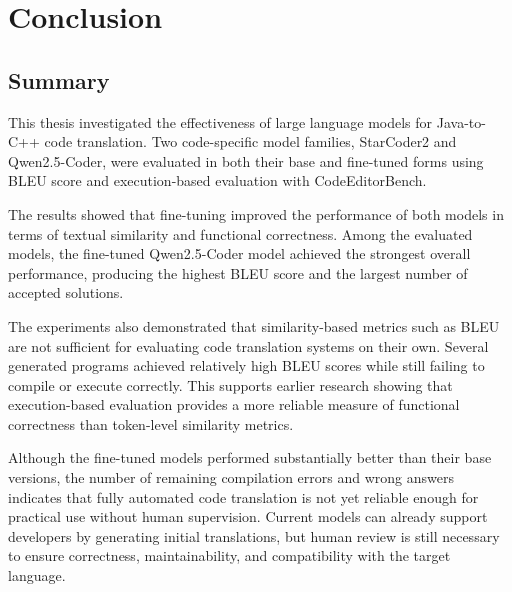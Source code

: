 \chapter{Conclusion}

\section{Summary}

This thesis investigated the effectiveness of large language models for
Java-to-C++ code translation. Two code-specific model families, StarCoder2 and
Qwen2.5-Coder, were evaluated in both their base and fine-tuned forms using
BLEU score and execution-based evaluation with CodeEditorBench.

The results showed that fine-tuning improved the performance of both models in
terms of textual similarity and functional correctness. Among the evaluated %
models, the fine-tuned Qwen2.5-Coder model achieved the strongest overall
performance, producing the highest BLEU score and the largest number of accepted
solutions.

The experiments also demonstrated that similarity-based metrics such as BLEU are
not sufficient for evaluating code translation systems on their own. Several
generated programs achieved relatively high BLEU scores while still failing to
compile or execute correctly. This supports earlier research showing that
execution-based evaluation provides a more reliable measure of functional
correctness than token-level similarity metrics.

Although the fine-tuned models performed substantially better than their base
versions, the number of remaining compilation errors and wrong answers indicates
that fully automated code translation is not yet reliable enough for practical
use without human supervision. Current models can already support developers by
generating initial translations, but human review is still necessary to ensure
correctness, maintainability, and compatibility with the target language.